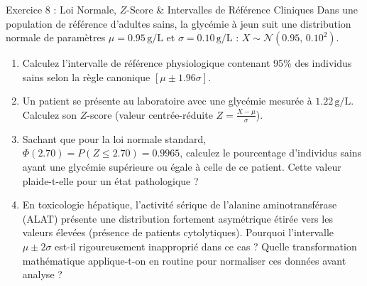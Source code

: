 \documentclass[11pt,a4paper]{article}
\begin{document}
\begin{exercicebox}{Exercice 8 : Loi Normale, $Z$-Score \& Intervalles de Référence Cliniques}
Dans une population de référence d'adultes sains, la glycémie à jeun suit une distribution normale de paramètres $\mu = 0.95\,\text{g/L}$ et $\sigma = 0.10\,\text{g/L}$ : $X \sim \mathcal{N}(0.95, \, 0.10^2)$.
\begin{enumerate}[label=\textbf{\alph*.}]
  \item Calculez l'intervalle de référence physiologique contenant 95\% des individus sains selon la règle canonique $[\mu \pm 1.96\sigma]$.
  \item Un patient se présente au laboratoire avec une glycémie mesurée à $1.22\,\text{g/L}$. Calculez son $Z$-score (valeur centrée-réduite $Z = \frac{X - \mu}{\sigma}$).
  \item Sachant que pour la loi normale standard, $\Phi(2.70) = P(Z \le 2.70) = 0.9965$, calculez le pourcentage d'individus sains ayant une glycémie supérieure ou égale à celle de ce patient. Cette valeur plaide-t-elle pour un état pathologique ?
  \item En toxicologie hépatique, l'activité sérique de l'alanine aminotransférase (ALAT) présente une distribution fortement asymétrique étirée vers les valeurs élevées (présence de patients cytolytiques). Pourquoi l'intervalle $\mu \pm 2\sigma$ est-il rigoureusement inapproprié dans ce cas ? Quelle transformation mathématique applique-t-on en routine pour normaliser ces données avant analyse ?
\end{enumerate}
\end{exercicebox}
\end{document}
